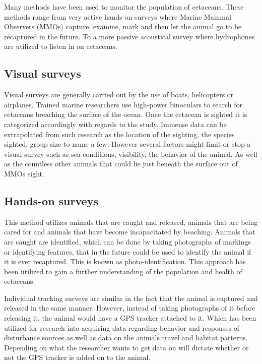 Many methods have been used to monitor the population of cetaceans.
These methods range from very active hands-on surveys where Marine Mammal Observers (MMOs) capture, examine, mark and then let the animal go to be recaptured in the future.
To a more passive acoustical survey where hydrophones are utilized to listen in on cetaceans.


\subsection{Visual surveys}%

Visual surveys are generally carried out by the use of boats, helicopters or airplanes.
Trained marine researchers use high-power binoculars to search for cetaceans breaching the surface of the ocean.
Once the cetacean is sighted it is categorized accordingly with regards to the study.
Immense data can be extrapolated from such research as the location of the sighting, the species sighted, group size to name a few\cite{campbell_inter-annual_2015}.
However several factors might limit or stop a visual survey such as sea conditions, visibility, the behavior of the animal.
As well as the countless other animals that could lie just beneath the surface out of MMOs sight.

\subsection{Hands-on surveys}

This method utilizes animals that are caught and released, animals that are being cared for and animals that have become incapacitated by beaching. 
Animals that are caught are identified, which can be done by taking photographs of markings or identifying features, that in the future could be used to identify the animal if it is ever recaptured.
This is known as photo-identification\cite{booth_methods_2020}.
This approach has been utilized to gain a further understanding of the population and health of cetaceans.

Individual tracking surveys are similar in the fact that the animal is captured and released in the same manner.
However, instead of taking photographs of it before releasing it, the animal would have a GPS tracker attached to it. 
Which has been utilized for research into acquiring data regarding behavior and responses of disturbance sources as well as data on the animals travel and habitat patterns. 
Depending on what the researcher wants to get data on will dictate whether or not the GPS tracker is added on to the animal\cite{booth_methods_2020}.



